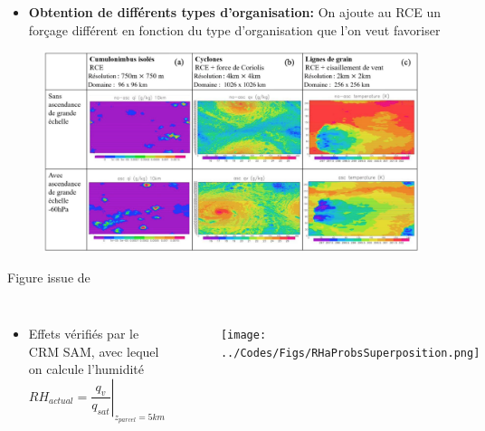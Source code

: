\documentclass[10pt]{beamer}
\begin{document}
\begin{frame}
    \begin{itemize}
        \item \textbf{Obtention de différents types d'organisation:} On ajoute au RCE un forçage différent en fonction du type d'organisation que l'on veut favoriser
    \end{itemize}
    \begin{figure}[hbtp]
        \centering
        \includegraphics[width=11cm]{Figures/DufauxTable.png}
    \end{figure}
    Figure issue de \textcite{dufauxRapportStageLicence2021}
\end{frame}

\begin{frame}{\secname}
\begin{columns}
    \begin{itemize}
        \item Effets vérifiés par le CRM SAM, avec lequel on calcule l'humidité
        $$
        RH_{actual} = \left.\frac{q_v}{q_{sat}}\right|_{z_{parcel}=5km}
        $$
    \end{itemize}
    \begin{figure}
        \centering
        \texttt{[image: ../Codes/Figs/RHaProbsSuperposition.png]}
        \label{RHactual0}
    \end{figure}
\end{columns}
\end{frame}
\end{document}
